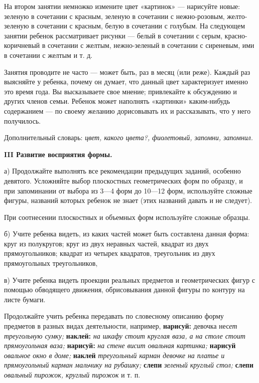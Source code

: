 \documentclass[a5paper]{book}
\renewcommand{\emph}[1]{\textit{#1}}
\begin{document}
На втором занятии немножко измените цвет «картинок» --- нарисуйте новые:
зеленую в сочетании с красным, зеленую в сочетании с нежно-розовым,
желто-зеленую в сочетании с красным, белую в сочетании с голубым. На
следующем занятии ребенок рассматривает рисунки --- белый в сочетании с
серым, красно-коричневый в сочетании с желтым, нежно-зеленый в сочетании
с сиреневым, ими в сочетании с желтым и т. д.

Занятия проводите не часто --- может быть, раз в месяц (или реже).
Каждый раз выясняйте у ребенка, почему он думает, что данный цвет
характеризует именно это время года. Вы высказываете свое мнение;
привлекайте к обсуждению и других членов семьи. Ребенок может наполнять
«картинки» каким-нибудь содержанием --- по своему желанию дорисовывать
их и рассказывать, что у него получилось.

Дополнительный словарь: \emph{цвет, какого цвета?, фиолетовый, запомни,
запомнил.}

\textbf{III Развитие восприятия формы.}

а) Продолжайте выполнять все рекомендации предыдущих заданий, особенно
девятого. Усложняйте выбор плоскостных геометрических форм по образцу, и
при запоминании от выбора из 3---4 форм до 10---12 форм, используйте
сложные фигуры, названий которых ребенок не знает (этих названий давать
и не следует).

При соотнесении плоскостных и объемных форм используйте сложные образцы.

б) Учите ребенка видеть, из каких частей может быть составлена данная
форма: круг из полукругов; круг из двух неравных частей, квадрат из двух
прямоугольников; квадрат из четырех квадратов, треугольник из двух
прямоугольных треугольников,

в) Учите ребенка видеть проекции реальных предметов и геометрических
фигур с помощью обводящего движения, обрисовывания данной фигуры по
контуру на листе бумаги.

Продолжайте учить ребенка передавать по словесному описанию форму
предметов в разных видах деятельности, например, \textbf{нарисуй:}
девочка нес\emph{ет треугольную сумку;} \textbf{наклей:} \emph{на шкафу
стоит круглая ваза, а на столе стоит прямоугольная ваза;}
\textbf{нарисуй:} \emph{на стене висит овальная картинка;}
\textbf{нарисуй} \emph{овальное окно в доме;} \textbf{наклей}
\emph{треугольный карман девочке на платье и прямоугольный карман
мальчику на рубашку;} \textbf{слепи} \emph{зеленый круглый стол;}
\textbf{слепи} \emph{овальный пирожок, круглый пирожок} и т. п.
\end{document}
